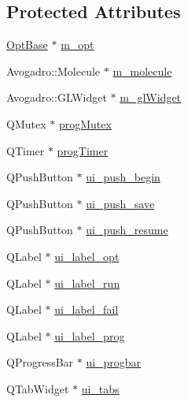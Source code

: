 \subsection*{Protected Attributes}
\begin{DoxyCompactItemize}
\item 
\hyperlink{classGlobalSearch_1_1OptBase}{Opt\+Base} $\ast$ \hyperlink{classGlobalSearch_1_1AbstractDialog_a6a5b08f59d1521ebc4769e9e9903346b}{m\+\_\+opt}
\item 
Avogadro\+::\+Molecule $\ast$ \hyperlink{classGlobalSearch_1_1AbstractDialog_a9cf65fe592eebca0ec72a5597edc7faf}{m\+\_\+molecule}
\item 
Avogadro\+::\+G\+L\+Widget $\ast$ \hyperlink{classGlobalSearch_1_1AbstractDialog_a18c6963416c0b49012fa94fd451c96d9}{m\+\_\+gl\+Widget}
\item 
Q\+Mutex $\ast$ \hyperlink{classGlobalSearch_1_1AbstractDialog_a06e3b73c319208a706aaf629a5f05165}{prog\+Mutex}
\item 
Q\+Timer $\ast$ \hyperlink{classGlobalSearch_1_1AbstractDialog_a1cf317e8206fd80628a9fe6d2ec711fc}{prog\+Timer}
\item 
Q\+Push\+Button $\ast$ \hyperlink{classGlobalSearch_1_1AbstractDialog_a526c9ad4ea52454ba41be74de24cdd6c}{ui\+\_\+push\+\_\+begin}
\item 
Q\+Push\+Button $\ast$ \hyperlink{classGlobalSearch_1_1AbstractDialog_a695ed25af57ce8c854e21d3f2c18e250}{ui\+\_\+push\+\_\+save}
\item 
Q\+Push\+Button $\ast$ \hyperlink{classGlobalSearch_1_1AbstractDialog_a04a1131601c5eab39ef105f385aceca5}{ui\+\_\+push\+\_\+resume}
\item 
Q\+Label $\ast$ \hyperlink{classGlobalSearch_1_1AbstractDialog_af30548b5ed4d5a22a7dc648afae4115b}{ui\+\_\+label\+\_\+opt}
\item 
Q\+Label $\ast$ \hyperlink{classGlobalSearch_1_1AbstractDialog_af65c818f2bf846bcd76aa0e755e13453}{ui\+\_\+label\+\_\+run}
\item 
Q\+Label $\ast$ \hyperlink{classGlobalSearch_1_1AbstractDialog_a28b127a410ed219e13a0e85c889934e7}{ui\+\_\+label\+\_\+fail}
\item 
Q\+Label $\ast$ \hyperlink{classGlobalSearch_1_1AbstractDialog_a21e1395aea6ac29a9c97b7ec2f54eb14}{ui\+\_\+label\+\_\+prog}
\item 
Q\+Progress\+Bar $\ast$ \hyperlink{classGlobalSearch_1_1AbstractDialog_a9b91400d03e9c7f3e94bf6b1f91bb97a}{ui\+\_\+progbar}
\item 
Q\+Tab\+Widget $\ast$ \hyperlink{classGlobalSearch_1_1AbstractDialog_acc93d22a99eb7c11610494ce754b1502}{ui\+\_\+tabs}
\end{DoxyCompactItemize}


